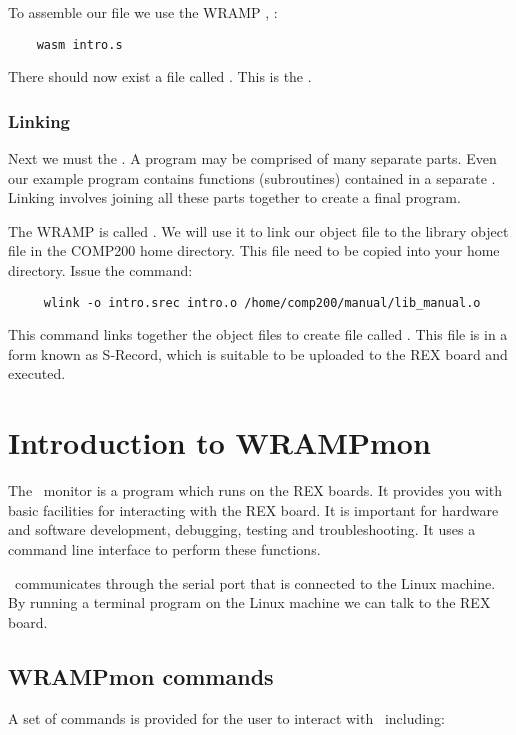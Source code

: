 To assemble our file we use the WRAMP , :
\begin{verbatim}
    wasm intro.s
\end{verbatim}

There should now exist a file called .  This is the 
.

\subsubsection{Linking}
Next we must  the .  A program may be
comprised of many separate parts.  Even our example program contains
functions (subroutines) contained in a separate . Linking
involves joining all these parts together to create a final program.

The WRAMP  is called .  We will use it to
link our object file to the library object file in the COMP200 home directory.
This file  need to be copied into your home directory.
Issue the command:
\begin{verbatim}
     wlink -o intro.srec intro.o /home/comp200/manual/lib_manual.o
\end{verbatim}

This command links together the object files to create file called
.  This file is in a form known as S-Record, which
is suitable to be uploaded to the REX board and executed.

%
%
%
\section{Introduction to WRAMPmon}
\label{intro:wrampmon}

The \WRAMPmon\ monitor is a program which runs on the REX boards.  It
provides you with basic facilities for interacting with the REX board.
It is important for hardware and software development, debugging,
testing and troubleshooting.  It uses a command line interface to
perform these functions.

\WRAMPmon\ communicates through the serial port that is connected to the Linux 
machine.  By running a terminal program on the Linux machine we can talk
to the REX board.


\subsection{WRAMPmon commands}
A set of commands is provided for the user to interact with \WRAMPmon\
including:


